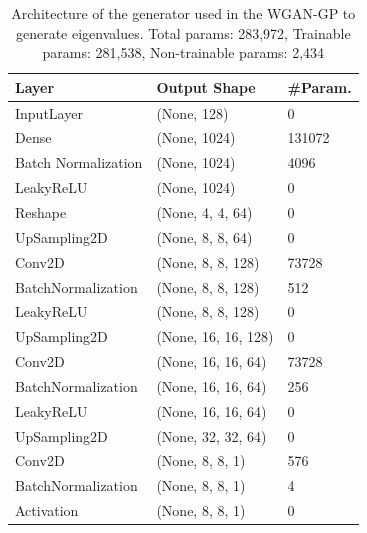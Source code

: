 \documentclass{article}
\begin{document}
\begin{table}[]
    \begin{tabular}{|l|l|l|}
    \hline
    \textbf{Layer}      & \textbf{Output Shape} & \textbf{\#Param.} \\ \hline
    InputLayer          & (None, 128)           & 0                             \\ \hline
    Dense               & (None, 1024)          & 131072                        \\ \hline
    Batch Normalization & (None, 1024)          & 4096                          \\ \hline
    LeakyReLU           & (None, 1024)          & 0                             \\ \hline
    Reshape             & (None, 4, 4, 64)      & 0                             \\ \hline
    UpSampling2D        & (None, 8, 8, 64)      & 0                             \\ \hline
    Conv2D              & (None, 8, 8, 128)     & 73728                         \\ \hline
    BatchNormalization  & (None, 8, 8, 128)     & 512                           \\ \hline
    LeakyReLU           & (None, 8, 8, 128)     & 0                             \\ \hline
    UpSampling2D        & (None, 16, 16, 128)   & 0                             \\ \hline
    Conv2D              & (None, 16, 16, 64)    & 73728                         \\ \hline
    BatchNormalization  & (None, 16, 16, 64)    & 256                           \\ \hline
    LeakyReLU           & (None, 16, 16, 64)    & 0                             \\ \hline
    UpSampling2D        & (None, 32, 32, 64)    & 0                             \\ \hline
    Conv2D              & (None, 8, 8, 1)       & 576                           \\ \hline
    BatchNormalization  & (None, 8, 8, 1)       & 4                             \\ \hline
    Activation          & (None, 8, 8, 1)       & 0                             \\ \hline
    \end{tabular}
    \caption{Architecture of the generator used in the WGAN-GP to generate eigenvalues. Total params: 283,972, Trainable params: 281,538, Non-trainable params: 2,434}
    \label{tab:evals_generator_WGANGP_architecture}
\end{table}
\end{document}
